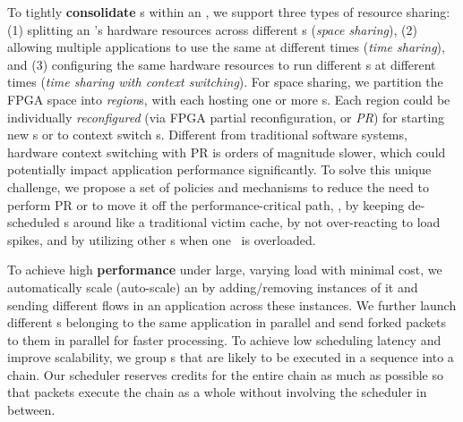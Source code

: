 To tightly \textbf{consolidate} \nt{}s within an \snic, we support three types of resource sharing: (1) splitting an \snic's hardware resources across different \nt{}s ({\em space sharing}), (2) allowing multiple applications to use the same \nt{} at different times ({\em time sharing}), and (3) configuring the same hardware resources to run different \nt{}s at different times ({\em time sharing with context switching}).
For space sharing, we partition the FPGA space into {\em region}s, with each hosting one or more \nt{}s.
Each region could be individually {\em reconfigured} (via FPGA partial reconfiguration, or {\em PR}) for starting new \nt{}s or to context switch \nt{}s.
Different from traditional software systems, hardware context switching with PR is orders of magnitude slower, which could potentially impact application performance significantly.
To solve this unique challenge, we propose a set of policies and mechanisms to reduce the need to perform PR or to move it off the performance-critical path, \eg, by keeping de-scheduled \nt{}s around like a traditional victim cache, by not over-reacting to load spikes, and by utilizing other \snic{}s when one \snic\ is overloaded.

To achieve high \textbf{performance} under large, varying load with minimal cost, we automatically scale (auto-scale) an \nt{} by adding/removing instances of it and sending different flows in an application across these instances.
We further launch different \nt{}s belonging to the same application in parallel and send forked packets to them in parallel for faster processing.
To achieve low scheduling latency and improve scalability, we group \nt{}s that are likely to be executed in a sequence into a chain.
Our scheduler reserves credits for the entire chain as much as possible so that packets execute the chain as a whole without involving the scheduler in between.

